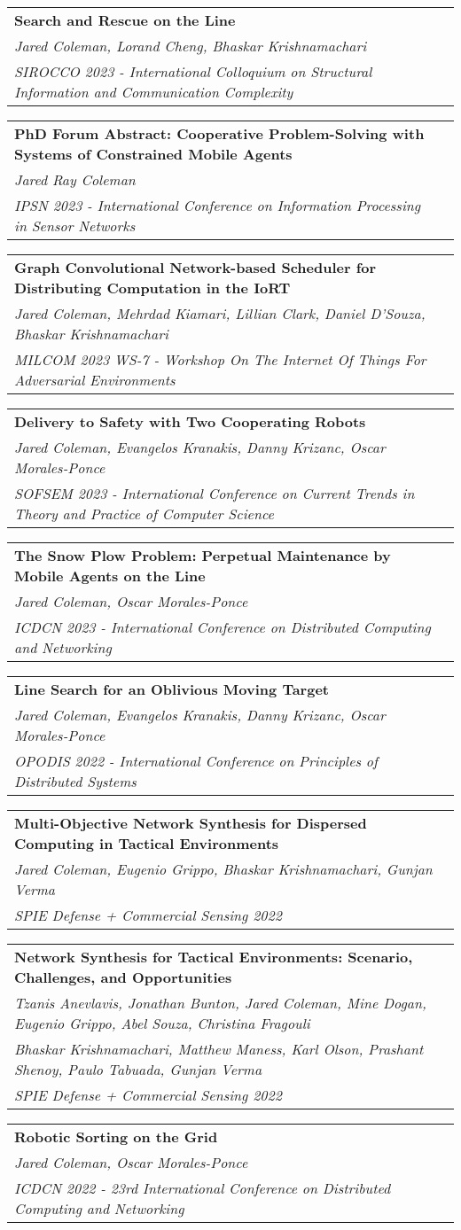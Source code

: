 \documentclass[letterpaper,11pt]{article}
\makeatletter
\newcommand{\resumeSubheadingTwo}[6]{
  \vspace{-1pt}\item[]
    \begin{tabular*}{0.97\textwidth}{l@{\extracolsep{\fill}}r}
      \textbf{#1} & #2 \\
      \textit{\small#3} & \textit{\small #4} \\
      \textit{\small#5} & \textit{\small #6}
    \end{tabular*}\vspace{-5pt}
}
\newcommand{\resumeSubheadingThree}[8]{
  \vspace{-1pt}\item[]
    \begin{tabular*}{0.97\textwidth}{l@{\extracolsep{\fill}}r}
      \textbf{#1} & #2 \\
      \textit{\small#3} & \textit{\small #4} \\
      \textit{\small#5} & \textit{\small #6} \\
      \textit{\small#7} & \textit{\small #8} 
    \end{tabular*}\vspace{-5pt}
}
\makeatother
\begin{document}
    \resumeSubheadingTwo
    {Search and Rescue on the Line}{}
    {Jared Coleman, Lorand Cheng, Bhaskar Krishnamachari}{}
    {SIROCCO 2023 - International Colloquium on Structural Information and Communication Complexity}{}

    \resumeSubheadingTwo
    {PhD Forum Abstract: Cooperative Problem-Solving with Systems of Constrained Mobile Agents}{}
    {Jared Ray Coleman}{}
    {IPSN 2023 - International Conference on Information Processing in Sensor Networks}{}

    \resumeSubheadingTwo
    {Graph Convolutional Network-based Scheduler for Distributing Computation in the IoRT}{}
    {Jared Coleman, Mehrdad Kiamari, Lillian Clark, Daniel D'Souza, Bhaskar Krishnamachari}{}
    {MILCOM 2023 WS-7 - Workshop On The Internet Of Things For Adversarial Environments}{}

    \resumeSubheadingTwo
    {Delivery to Safety with Two Cooperating Robots}{}
    {Jared Coleman, Evangelos Kranakis, Danny Krizanc, Oscar Morales-Ponce}{}
    {SOFSEM 2023 - International Conference on Current Trends in Theory and Practice of Computer Science}{}

    \resumeSubheadingTwo
    {The Snow Plow Problem: Perpetual Maintenance by Mobile Agents on the Line}{}
    {Jared Coleman, Oscar Morales-Ponce}{}
    {ICDCN 2023 - International Conference on Distributed Computing and Networking}{}

    \resumeSubheadingTwo
    {Line Search for an Oblivious Moving Target}{}
    {Jared Coleman, Evangelos Kranakis, Danny Krizanc, Oscar Morales-Ponce}{}
    {OPODIS 2022 - International Conference on Principles of Distributed Systems}{}

    \resumeSubheadingTwo
    {Multi-Objective Network Synthesis for Dispersed Computing in Tactical Environments}{}
    {Jared Coleman, Eugenio Grippo, Bhaskar Krishnamachari, Gunjan Verma}{}
    {SPIE Defense + Commercial Sensing 2022}{}

    \resumeSubheadingThree
    {Network Synthesis for Tactical Environments: Scenario, Challenges, and Opportunities}{}
    {Tzanis Anevlavis, Jonathan Bunton, Jared Coleman, Mine Dogan, Eugenio Grippo, Abel Souza, Christina Fragouli}{}
    {Bhaskar Krishnamachari, Matthew Maness, Karl Olson, Prashant Shenoy, Paulo Tabuada, Gunjan Verma}{}
    {SPIE Defense + Commercial Sensing 2022}{}

    \resumeSubheadingTwo
    {Robotic Sorting on the Grid}{}
    {Jared Coleman, Oscar Morales-Ponce}{}
    {ICDCN 2022 - 23rd International Conference on Distributed Computing and Networking}{}
    {}{}
\end{document}
